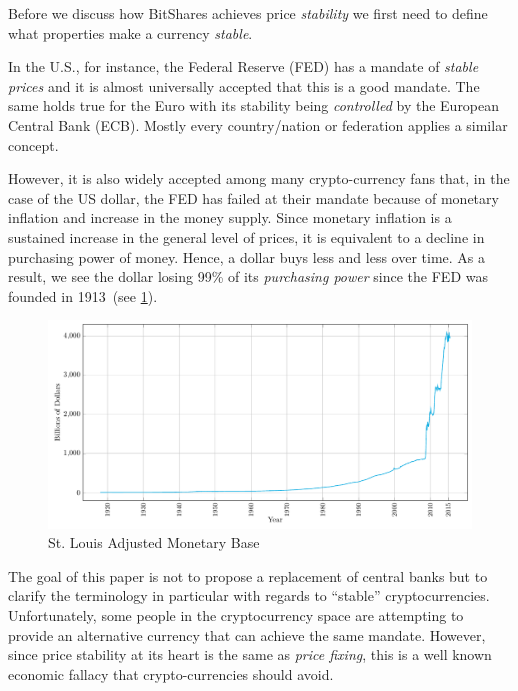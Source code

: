 Before we discuss how BitShares achieves price \emph{stability} we first need to
define what properties make a currency \emph{stable}.

In the U.S., for instance, the Federal Reserve (FED) has a mandate of
\emph{stable prices} and it is almost universally accepted that this is a good
mandate. The same holds true for the Euro with its stability being
\emph{controlled} by the European Central Bank (ECB). Mostly every
country/nation or federation applies a similar concept.

However, it is also widely accepted among many crypto-currency fans that, in
the case of the US dollar, the FED has failed at their mandate because of
monetary inflation and increase in the money supply. Since monetary inflation
is a sustained increase in the general level of prices, it is equivalent to a
decline in purchasing power of money. Hence, a dollar buys less and less over
time. As a result, we see the dollar losing 99\% of its \emph{purchasing power}
since the FED was founded in 1913~(see \cref{fig:monetarybase}). 

\begin{figure}[!htp]
 \centering
 \includegraphics[width=\linewidth]{figures/monetary-base}
 \caption{St. Louis Adjusted Monetary Base~\cite{ambsl}}
 \label{fig:monetarybase}
\end{figure}

The goal of this paper is not to propose a replacement of central banks but to
clarify the terminology in particular with regards to ``stable''
cryptocurrencies. Unfortunately, some people in the cryptocurrency space are
attempting to provide an alternative currency that can achieve the same
mandate. However, since price stability at its heart is the same as \emph{price
fixing}, this is a well known economic fallacy that crypto-currencies should
avoid.


